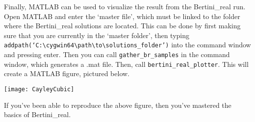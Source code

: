 Finally, MATLAB can be used to visualize the result from the Bertini\_real run. Open MATLAB and enter the `master file', which must be linked to the folder where the Bertini\_real solutions are located. This can be done by first making sure that you are currently in the `master folder', then typing \texttt{addpath(`C:\textbackslash{cygwin64}\textbackslash{path}\textbackslash{to}\textbackslash{solutions\_folder}')} into the command window and pressing enter. Then you can call \texttt{gather\_br\_samples} in the command window, which generates a .mat file. Then, call \texttt{bertini\_real\_plotter\-}. This will create a MATLAB figure, pictured below.

\begin{center}\begin{minipage}{0.9\linewidth}
\centering
\texttt{[image: CayleyCubic]}
\end{minipage}\end{center}


If you've been able to reproduce the above figure, then you've mastered the basics of Bertini\_real. 





